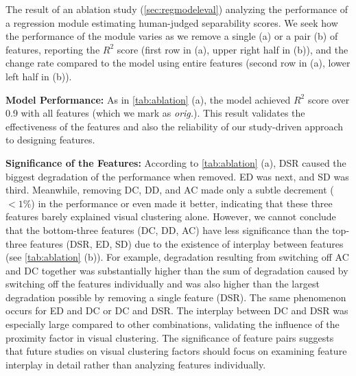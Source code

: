 {\begin{table}[t]
\begin{subtable}[]{\linewidth}
    \end{subtable}

    
    \caption{The result of an ablation study (\autoref{sec:regmodeleval}) analyzing the performance of a regression module estimating human-judged separability scores. We seek how the performance of the module varies as we remove a single (a) or a pair (b) of features, reporting the $R^2$ score (first row in (a), upper right half in (b)), and the change rate compared to the model using entire features (second row in (a), lower left half in (b)). }
    \label{tab:ablation}
\end{table}
}


\textbf{Model Performance:}
As in \autoref{tab:ablation} (a), the model achieved $R^2$ score over 0.9 with all features (which we mark as \textit{orig.}). 
This result validates the effectiveness of the features and also the reliability of our study-driven approach to designing features.

\noindent \textbf{Significance of the Features:}
According to \autoref{tab:ablation} (a), DSR caused the biggest degradation of the performance when removed. ED was next, and SD was third. Meanwhile, removing DC, DD, and AC made only a subtle decrement ($<1\%$) in the performance or even made it better, indicating that these three features barely explained visual clustering alone. 
However, we cannot 
conclude that the bottom-three features (DC, DD, AC) have less significance than the top-three features (DSR, ED, SD) due to the existence of interplay between features (see \autoref{tab:ablation} (b)). For example, degradation resulting from switching off AC and DC together was substantially higher than the sum of degradation caused by switching off the features individually and was also higher than the largest degradation possible by removing a single feature (DSR). The same phenomenon occurs for ED and DC or DC and DSR. The interplay between DC and DSR was especially large compared to other combinations, validating the influence of the proximity factor in visual clustering. 
The significance of feature pairs suggests that future studies on visual clustering factors should focus on examining feature interplay in detail rather than analyzing features individually.

